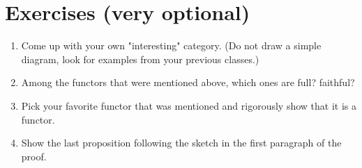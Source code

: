 \documentclass{article}
\theoremstyle{definition}
\theoremstyle{remark}
\begin{document}
\section{Exercises (very optional)}
\begin{enumerate}
	\item Come up with your own "interesting" category. (Do not draw a simple diagram, look for examples from your previous classes.)
	\item Among the functors that were mentioned above, which ones are full? faithful?
	\item Pick your favorite functor that was mentioned and rigorously show that it is a functor.
	\item Show the last proposition following the sketch in the first paragraph of the proof.
\end{enumerate}
\end{document}
